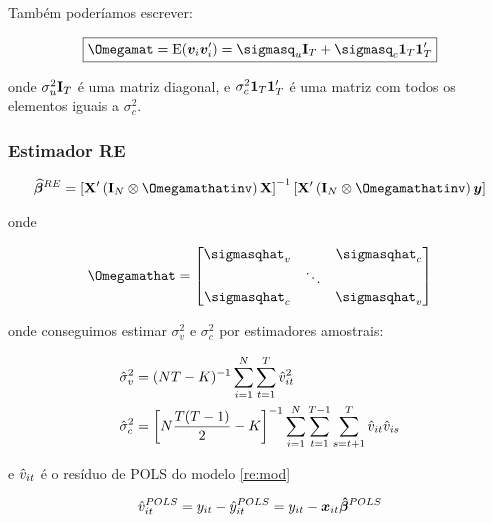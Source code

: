 \documentclass[11pt, oneside, a4paper, article]{article}
\numberwithin{equation}{section}
\begin{document}
\begin{description}
\noindent
Também poderíamos escrever:

\vspace{-1 em}
\begin{align*}
\boxed{\Omegamat = \E(\mbs{v}_{i} \mbs{v}_{i}') =
\sigmasq_{u} \Imat_{T} + \sigmasq_{c} \onevec_{T} \onevec_{T}'}
\end{align*}

\noindent
onde
$\sigma^{2}_{u} \mathbf{I}_{T}$ 
é uma matriz diagonal, e 
$\sigma_{c}^{2} \boldsymbol{1}_{T} \boldsymbol{1}_{T}'$ é uma matriz com todos os elementos iguais a $\sigma_{c}^{2}$.

\subsubsection{Estimador RE}

\vspace{-1.5 em}
\begin{align}
\label{re:betahat}
\betavechat^{RE}
= 
\left[ \Xmat' \left( \Imat_{N} \otimes \Omegamathatinv \right) \Xmat \right]^{-1}
\left[ \Xmat' \left( \Imat_{N} \otimes \Omegamathatinv \right) \yvec \right]
\end{align}

\noindent
onde

\vspace{-1 em}
\begin{align*}
\Omegamathat =
\begin{bmatrix}
\sigmasqhat_{v} & & \sigmasqhat_{c} \\	
& \ddots & \\
\sigmasqhat_{c} & & \sigmasqhat_{v}
\end{bmatrix}
\end{align*}

\noindent
onde conseguimos estimar $\sigma_{v}^{2}$ e $\sigma_{c}^{2}$ por estimadores amostrais:

\vspace{-1.5 em}
\begin{align*}
\hat{\sigma}_{v}^{2} &=
(NT - K)^{-1} \sum_{i=1}^{N} \sum_{t=1}^{T} \hat{v}_{it}^2
\\
\hat{\sigma}_{c}^{2} &=
\left[ N \frac{T ( T-1 )}{2} - K  \right]^{-1}
\sum_{i=1}^{N} \sum_{t=1}^{T-1} \sum_{s=t+1}^{T} \hat{v}_{it} \hat{v}_{is}
\end{align*}

\noindent
e $\hat{v}_{it}$ é o resíduo de POLS do modelo \eqref{re:mod}

\vspace{-1 em}
\begin{align*}
\hat{v}_{it}^{POLS} = 
y_{it} - \hat{y}_{it}^{POLS} =
y_{it} - \boldsymbol{x}_{it} \boldsymbol{\hat{\beta}}^{POLS}
\end{align*}


\end{description}
\end{document}
